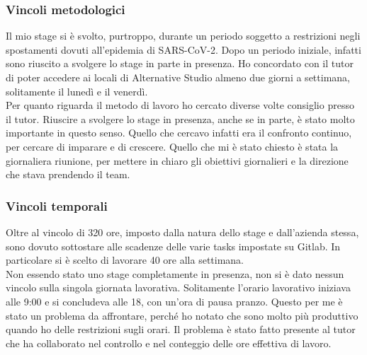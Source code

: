 \subsubsection{Vincoli metodologici}
Il mio stage si è svolto, purtroppo, durante un periodo soggetto a restrizioni negli spostamenti dovuti all'epidemia di SARS-CoV-2. Dopo un periodo iniziale, infatti sono riuscito a svolgere lo stage in parte in presenza. Ho concordato con il tutor di poter accedere ai locali di Alternative Studio almeno due giorni a settimana, solitamente il lunedì e il venerdì. \\
Per quanto riguarda il metodo di lavoro ho cercato diverse volte consiglio presso il tutor. Riuscire a svolgere lo stage in presenza, anche se in parte, è stato molto importante in questo senso. Quello che cercavo infatti era il confronto continuo, per cercare di imparare e di crescere. Quello che mi è stato chiesto è stata la giornaliera riunione, per mettere in chiaro gli obiettivi giornalieri e la direzione che stava prendendo il team.

\subsubsection{Vincoli temporali}
Oltre al vincolo di 320 ore, imposto dalla natura dello stage e dall'azienda stessa, sono dovuto sottostare alle scadenze delle varie tasks impostate su Gitlab. In particolare si è scelto di lavorare 40 ore alla settimana. \\
Non essendo stato uno stage completamente in presenza, non si è dato nessun vincolo sulla singola giornata lavorativa. Solitamente l'orario lavorativo iniziava alle 9:00 e si concludeva alle 18, con un'ora di pausa pranzo. Questo per me è stato un problema da affrontare, perché ho notato che sono molto più produttivo quando ho delle restrizioni sugli orari. Il problema è stato fatto presente al tutor che ha collaborato nel controllo e nel conteggio delle ore effettiva di lavoro.

